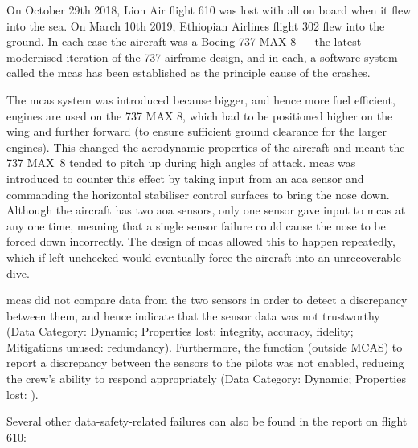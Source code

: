On October 29th 2018, Lion Air flight 610 was lost with all on board when it flew into the sea. On March 10th 2019, Ethiopian Airlines flight 302 flew into the ground. In each case the aircraft was a Boeing 737 MAX 8 --- the latest modernised iteration of the 737 airframe design, and in each, a software system called the \gls{mcas} has been established as the principle cause of the crashes.

The \gls{mcas} system was introduced because bigger, and hence more fuel efficient, engines are used on the 737 MAX 8, which had to be positioned higher on the wing and further forward (to ensure sufficient ground clearance for the larger engines). This changed the aerodynamic properties of the aircraft and meant the 737 MAX~8 tended to pitch up during high angles of attack. \Gls{mcas} was introduced to counter this effect by taking input from an \gls{aoa} sensor and commanding the horizontal stabiliser control surfaces to bring the nose down. Although the aircraft has two \gls{aoa} sensors, only one sensor gave input to \gls{mcas} at any one time, meaning that a single sensor failure could cause the nose to be forced down incorrectly. The design of \gls{mcas} allowed this to happen repeatedly, which if left unchecked would eventually force the aircraft into an unrecoverable dive.

\Gls{mcas} did not compare data from the two sensors in order to detect a discrepancy between them, and hence indicate that the sensor data was not trustworthy (Data Category: Dynamic; Properties lost: \gls{integrity}, \gls{accuracy}, \gls{fidelity}; Mitigations unused: redundancy). Furthermore, the function (outside MCAS) to report a discrepancy between the sensors to the pilots was not enabled, reducing the crew's ability to respond appropriately (Data Category: Dynamic; Properties lost: ).

Several other data-safety-related failures can also be found in the report on flight 610:

